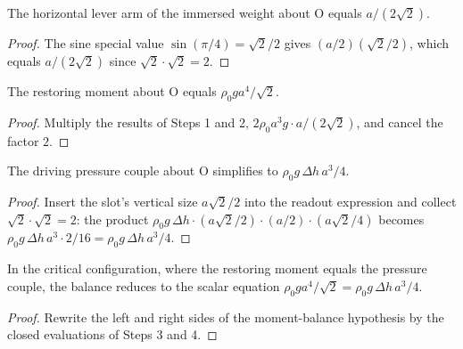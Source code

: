 \begin{lemma}
\label{lem:IPhO2026Problems_problem_IPhO_2026_1_A_1:weight_lever_arm_eq}
The horizontal lever arm of the immersed weight about O equals
$a/(2\sqrt{2})$.
\end{lemma}
\begin{proof}
The sine special value $\sin(\pi/4) = \sqrt{2}/2$ gives
$(a/2)(\sqrt{2}/2)$, which equals $a/(2\sqrt{2})$ since
$\sqrt{2}\cdot\sqrt{2} = 2$.
\end{proof}

\begin{lemma}
\label{lem:IPhO2026Problems_problem_IPhO_2026_1_A_1:restoring_moment_eq}
The restoring moment about O equals $\rho_0 g a^4/\sqrt{2}$.
\end{lemma}
\begin{proof}
Multiply the results of Steps 1 and 2,
$2\rho_0 a^3 g \cdot a/(2\sqrt{2})$, and cancel the factor $2$.
\end{proof}

\begin{lemma}
\label{lem:IPhO2026Problems_problem_IPhO_2026_1_A_1:pressure_couple_eq}
The driving pressure couple about O simplifies to
$\rho_0 g\, \Delta h\, a^3/4$.
\end{lemma}
\begin{proof}
Insert the slot's vertical size $a\sqrt{2}/2$ into the readout expression and
collect $\sqrt{2}\cdot\sqrt{2} = 2$: the product
$\rho_0 g\, \Delta h \cdot (a\sqrt{2}/2) \cdot (a/2) \cdot (a\sqrt{2}/4)$
becomes $\rho_0 g\, \Delta h\, a^3 \cdot 2/16 = \rho_0 g\, \Delta h\, a^3/4$.
\end{proof}

\begin{lemma}
\label{lem:IPhO2026Problems_problem_IPhO_2026_1_A_1:critical_balance_eq}
In the critical configuration, where the restoring moment equals the pressure
couple, the balance reduces to the scalar equation
$\rho_0 g a^4/\sqrt{2} = \rho_0 g\, \Delta h\, a^3/4$.
\end{lemma}
\begin{proof}
Rewrite the left and right sides of the moment-balance hypothesis by the
closed evaluations of Steps 3 and 4.
\end{proof}


